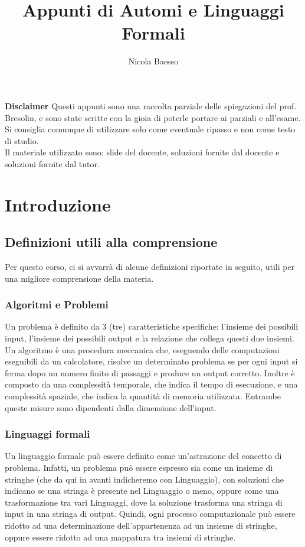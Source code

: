 \documentclass[]{article}
\title{Appunti di Automi e Linguaggi Formali}
\author{Nicola Baesso}
\begin{document}
	\maketitle
	
	\newpage
	\tableofcontents
	\newpage
	
	\textbf{Disclaimer}
	\newline
	\newline
	Questi appunti sono una raccolta parziale delle spiegazioni del prof. Bresolin, e sono state scritte con la gioia di poterle portare ai parziali e all'esame. Si consiglia comunque di utilizzare solo come eventuale ripasso e non come testo di studio.\\
	Il materiale utilizzato sono: slide del docente, soluzioni fornite dal docente e soluzioni fornite dal tutor.
	\newpage
	\section{Introduzione}
		\subsection{Definizioni utili alla comprensione}
			Per questo corso, ci si avvarrà di alcune definizioni riportate in seguito, utili per una migliore comprensione della materia.
			\subsubsection{Algoritmi e Problemi}
				Un problema è definito da 3 (tre) caratteristiche specifiche: l'insieme dei possibili input, l'insieme dei possibili output e la relazione che collega questi due insiemi.
				\newline
				Un algoritmo è una procedura meccanica che, eseguendo delle computazioni eseguibili da un calcolatore, risolve un determinato problema se per ogni input si ferma dopo un numero finito di passaggi e produce un output corretto.
				\newline Inoltre è composto da una complessità temporale, che indica il tempo di esecuzione, e una complessità spaziale, che indica la quantità di memoria utilizzata. Entrambe queste misure sono dipendenti dalla dimensione dell'input.
			\subsubsection{Linguaggi formali}
				Un linguaggio formale può essere definito come un'astrazione del concetto di problema. 
				\newline
				Infatti, un problema può essere espresso sia come un insieme di stringhe (che da qui in avanti indicheremo con Linguaggio), con soluzioni che indicano se una stringa è presente nel Linguaggio o meno, oppure come una trasformazione tra vari Linguaggi, dove la soluzione trasforma una stringa di input in una stringa di output.
				\newline
				Quindi, ogni processo computazionale può essere ridotto ad una determinazione dell'appartenenza ad un insieme di stringhe, oppure essere ridotto ad una mappatura tra insiemi di stringhe.
\end{document}
